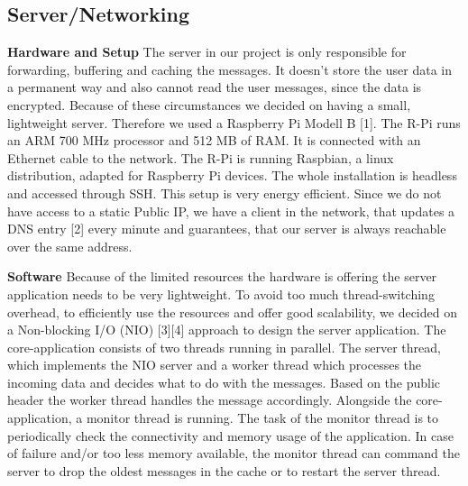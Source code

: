 \documentclass{report}
\begin{document}
\subsection{Server/Networking}
\textbf{Hardware and Setup}\newline
\indent The server in our project is only responsible for forwarding, buffering and caching the messages. It doesn't store the user data in a permanent way and also cannot read the user messages, since the data is encrypted. 
Because of these circumstances we decided on having a small, lightweight server. Therefore we used a Raspberry Pi Modell B [1]. The R-Pi runs an ARM 700 MHz processor and 512 MB of RAM. It is connected with an Ethernet cable to the network.
The R-Pi is running Raspbian, a linux distribution, adapted for Raspberry Pi devices. The whole installation is headless and accessed through SSH. This setup is very energy efficient. 
Since we do not have access to a static Public IP, we have a client in the network, that updates a DNS entry [2] every minute and guarantees, that our server is always reachable over the same address. 

\textbf{Software}\newline
\indent Because of the limited resources the hardware is offering the server application needs to be very lightweight. To avoid too much thread-switching overhead, to efficiently use the resources and offer good scalability, we decided on a Non-blocking I/O (NIO) [3][4] approach to design the server application. The core-application consists of two threads running in parallel. The server thread, which implements the NIO server and a worker thread which processes the incoming data and decides what to do with the messages. Based on the public header the worker thread handles the message accordingly.
Alongside the core-application, a monitor thread is running. The task of the monitor thread is to periodically check the connectivity and memory usage of the application. In case of failure and/or too less memory available, the monitor thread can command the server to drop the oldest messages in the cache or to restart the server thread. 
\end{document}
